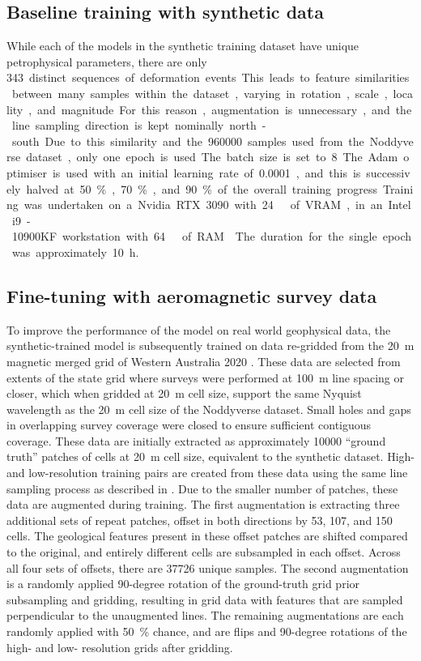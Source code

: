 \subsection{Baseline training with synthetic data}
\label{sec:baseline}
While each of the models in the synthetic training dataset have unique petrophysical parameters, there are only \qty{343} distinct sequences of deformation events.
This leads to feature similarities between many samples within the dataset, varying in rotation, scale, locality, and magnitude.
For this reason, augmentation is unnecessary, and the line sampling direction is kept nominally north-south.
Due to this similarity and the \qty{960000} samples used from the Noddyverse dataset, only one epoch is used.
The batch size is set to 8. The Adam optimiser is used with an initial learning rate of \num{0.0001}, and this is successively halved at 50\%, 70\%, and 90\% of the overall training progress.
Training was undertaken on a Nvidia RTX 3090 with \qty{24}{\giga\byte} of VRAM, in an Intel i9-10900KF workstation with \qty{64}{\giga\byte} of RAM\@.
The duration for the single epoch was approximately \qty{10}{\hour}.


\subsection{Fine-tuning with aeromagnetic survey data}
\label{sec:finetune}
To improve the performance of the model on real world geophysical data, the synthetic-trained model is subsequently trained on data re-gridded from the \qty{20}{\m} magnetic merged grid of Western Australia 2020 \parencite{brett20MagneticMerged2020}.
These data are selected from extents of the state grid where surveys were performed at \qty{100}{\m} line spacing or closer, which when gridded at \qty{20}{\m} cell size, support the same Nyquist wavelength as the \qty{20}{\m} cell size of the Noddyverse dataset.
Small holes and gaps in overlapping survey coverage were closed to ensure sufficient contiguous coverage.
These data are initially extracted as approximately \num{10000} “ground truth” patches of  cells at \qty{20}{\m} cell size, equivalent to the synthetic dataset.
High- and low-resolution training pairs are created from these data using the same line sampling process as described in .
Due to the smaller number of patches, these data are augmented during training.
The first augmentation is extracting three additional sets of repeat patches, offset in both directions by 53, 107, and 150 cells.
The geological features present in these offset patches are shifted compared to the original, and entirely different cells are subsampled in each offset.
Across all four sets of offsets, there are \num{37726} unique samples.
The second augmentation is a randomly applied 90-degree rotation of the ground-truth grid prior subsampling and gridding, resulting in grid data with features that are sampled perpendicular to the unaugmented lines.
The remaining augmentations are each randomly applied with \qty{50}{\percent} chance, and are flips and 90-degree rotations of the high- and low- resolution grids after gridding.


